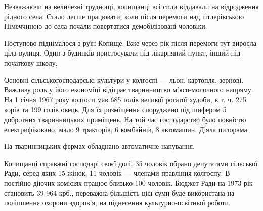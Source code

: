 Незважаючи на величезні труднощі, копищанці всі сили віддавали на відродження рідного села. Стало легше працювати, коли після перемоги над гітлерівською Німеччиною до села почали повертатися демобілізовані чоловіки.

Поступово піднімалося з руїн Копище. Вже через рік після перемоги тут виросла ціла вулиця. Один з будинків пристосували під лікарняний пункт, інший під початкову школу.

Основні сільськогосподарські культури у колгоспі — льон, картопля, зернові. Важливу роль у його економіці відіграє тваринництво м’ясо-молочного напряму. На 1 січня 1967 року колгосп мав 685 голів великої рогатої худоби, в т. ч. 275 корів та 199 голів овець. Для їх розміщення споруджено під шифером 5 добротних тваринницьких приміщень. На той час господарство було повністю електрифіковано, мало 9 тракторів, 6 комбайнів, 8 автомашин. Діяла пилорама.

На тваринницьких фермах обладнано автоматичне напування.

Копищанці справжні господарі своєї долі. 35 чоловік обрано депутатами сільської Ради, серед яких 15 жінок, 11 чоловік — членами правління колгоспу. В постійно діючих комісіях працює близько 100 чоловік. Бюджет Ради на 1973 рік становить 39 964 крб., переважна більшість цієї суми буде використана на поліпшення охорони здоров’я, на піднесення культурно-освітньої роботи.

